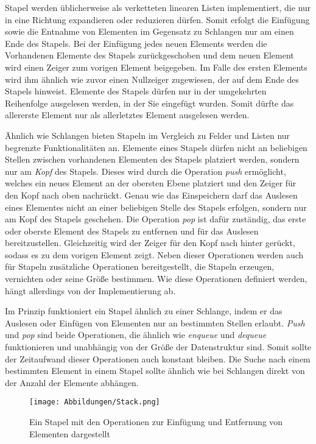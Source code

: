 Stapel werden üblicherweise als verketteten linearen Listen implementiert, die nur in eine Richtung expandieren oder reduzieren dürfen. Somit erfolgt die Einfügung sowie die Entnahme von Elementen im Gegensatz zu Schlangen nur am einen Ende des Stapels. Bei der Einfügung jedes neuen Elements werden die Vorhandenen Elemente des Stapels zurückgeschoben und dem neuen Element wird einen Zeiger zum vorigen Element beigegeben. Im Falle des ersten Elements wird ihm ähnlich wie zuvor einen Nullzeiger zugewiesen, der auf dem Ende des Stapels hinweist. Elemente des Stapels dürfen nur in der umgekehrten Reihenfolge ausgelesen werden, in der Sie eingefügt wurden. Somit dürfte das allererste Element nur als allerletztes Element ausgelesen werden. \autocite[363]{gumm_band_2016}

Ähnlich wie Schlangen bieten Stapeln im Vergleich zu Felder und Listen nur begrenzte Funktionalitäten an. Elemente eines Stapels dürfen nicht an beliebigen Stellen zwischen vorhandenen Elementen des Stapels platziert werden, sondern nur am \textit{Kopf} des Stapels. Dieses wird durch die Operation \textit{push} ermöglicht, welches ein neues Element an der obersten Ebene platziert und den Zeiger für den Kopf nach oben nachrückt. Genau wie das Einspeichern darf das Auslesen eines Elementes nicht an einer beliebigen Stelle des Stapels erfolgen, sondern nur am Kopf des Stapels geschehen. Die Operation \textit{pop} ist dafür zuständig, das erste oder oberste Element des Stapels zu entfernen und für das Auslesen bereitzustellen. Gleichzeitig wird der Zeiger für den Kopf nach hinter gerückt, sodass es zu dem vorigen Element zeigt. Neben dieser Operationen werden auch für Stapeln zusätzliche Operationen bereitgestellt, die Stapeln erzeugen, vernichten oder seine Größe bestimmen. Wie diese Operationen definiert werden, hängt allerdings von der Implementierung ab. \autocite[614]{ernst_grundkurs_2020} \autocite[45-46]{ollmert_datenstrukturen_2020}

Im Prinzip funktioniert ein Stapel ähnlich zu einer Schlange, indem er das Auslesen oder Einfügen von Elementen nur an bestimmten Stellen erlaubt. \textit{Push} und \textit{pop} sind beide Operationen, die ähnlich wie \textit{enqueue} und \textit{dequeue} funktionieren und unabhängig von der Größe der Datenstruktur sind. Somit sollte der Zeitaufwand dieser Operationen auch konstant bleiben. Die Suche nach einem bestimmten Element in einem Stapel sollte ähnlich wie bei Schlangen direkt von der Anzahl der Elemente abhängen.

\begin{figure}[t]
	\texttt{[image: Abbildungen/Stack.png]}
	\centering
	\caption{Ein Stapel mit den Operationen zur Einfügung und Entfernung von Elementen dargestellt \autocite[371]{gumm_band_2016}}
	\label{fig: stack}
\end{figure}


